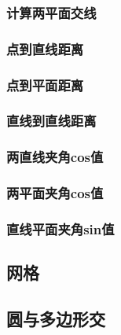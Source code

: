 \subsubsection{计算两平面交线}

\subsubsection{点到直线距离}

\subsubsection{点到平面距离}

\subsubsection{直线到直线距离}

\subsubsection{两直线夹角cos值}

\subsubsection{两平面夹角cos值}

\subsubsection{直线平面夹角sin值}


\subsection{网格}


\subsection{圆与多边形交}


